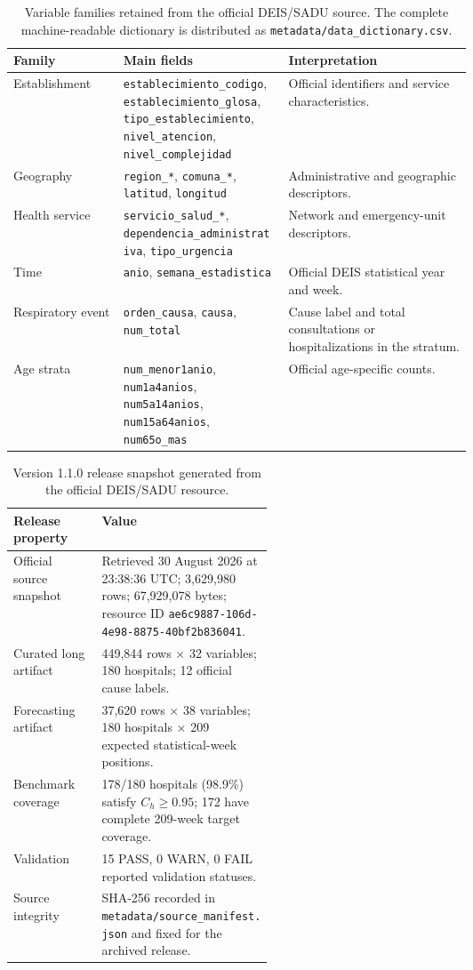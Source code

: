 \documentclass[data,datadescriptor,submit,moreauthors,pdftex]{Definitions/mdpi}
\newcommand{\sourceid}{ae6c9887-106d-4e98-8875-40bf2b836041}
\begin{document}
\begin{table}[H]
\caption{Variable families retained from the official DEIS/SADU source. The complete machine-readable dictionary is distributed as \texttt{metadata/data\_dictionary.csv}.}
\label{tab:source-fields}
\centering
\begin{tabularx}{\linewidth}{P{0.24\linewidth}P{0.36\linewidth}L}
\toprule
Family & Main fields & Interpretation \\
\midrule
Establishment & \texttt{establecimiento\_codigo}, \texttt{establecimiento\_glosa}, \texttt{tipo\_establecimiento}, \texttt{nivel\_atencion}, \texttt{nivel\_complejidad} & Official identifiers and service characteristics. \\
Geography & \texttt{region\_*}, \texttt{comuna\_*}, \texttt{latitud}, \texttt{longitud} & Administrative and geographic descriptors. \\
Health service & \texttt{servicio\_salud\_*}, \texttt{dependencia\_administrativa}, \texttt{tipo\_urgencia} & Network and emergency-unit descriptors. \\
Time & \texttt{anio}, \texttt{semana\_estadistica} & Official DEIS statistical year and week. \\
Respiratory event & \texttt{orden\_causa}, \texttt{causa}, \texttt{num\_total} & Cause label and total consultations or hospitalizations in the stratum. \\
Age strata & \texttt{num\_menor1anio}, \texttt{num1a4anios}, \texttt{num5a14anios}, \texttt{num15a64anios}, \texttt{num65o\_mas} & Official age-specific counts. \\
\bottomrule
\end{tabularx}
\end{table}

\begin{table}[H]
\caption{Version 1.1.0 release snapshot generated from the official DEIS/SADU resource.}
\label{tab:release-snapshot}
\centering
\begin{tabularx}{\linewidth}{P{0.34\linewidth}L}
\toprule
Release property & Value \\
\midrule
Official source snapshot & Retrieved 30 August 2026 at 23:38:36 UTC; 3,629,980 rows; 67,929,078 bytes; resource ID \texttt{\sourceid}. \\
Curated long artifact & 449,844 rows $\times$ 32 variables; 180 hospitals; 12 official cause labels. \\
Forecasting artifact & 37,620 rows $\times$ 38 variables; 180 hospitals $\times$ 209 expected statistical-week positions. \\
Benchmark coverage & 178/180 hospitals (98.9\%) satisfy $C_h\geq0.95$; 172 have complete 209-week target coverage. \\
Validation & 15 PASS, 0 WARN, 0 FAIL reported validation statuses. \\
Source integrity & SHA-256 recorded in \texttt{metadata/source\_manifest.json} and fixed for the archived release. \\
\bottomrule
\end{tabularx}
\end{table}
\end{document}
